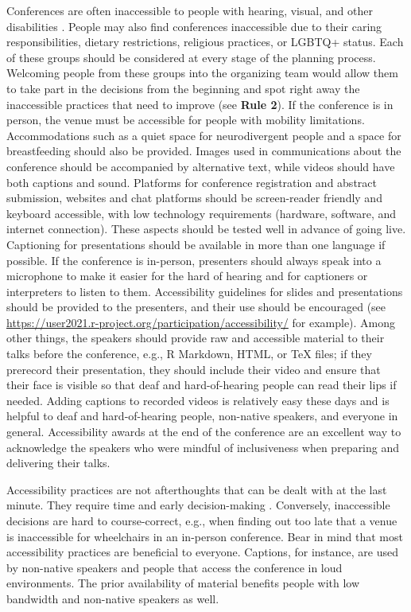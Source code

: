\documentclass[10pt,letterpaper]{article}
\begin{document}
Conferences are often inaccessible to people with hearing, visual, and other disabilities \cite{price_access_2009}. People may also find conferences inaccessible due to their caring responsibilities, dietary restrictions, religious practices, or LGBTQ+ status. Each of these groups should be considered at every stage of the planning process. Welcoming people from these groups into the organizing team would allow them to take part in the decisions from the beginning and spot right away the inaccessible practices that need to improve (see \textbf{Rule 2}). If the conference is in person, the venue must be accessible for people with mobility limitations. Accommodations such as a quiet space for neurodivergent people and a space for breastfeeding should also be provided. Images used in communications about the conference should be accompanied by alternative text, while videos should have both captions and sound. Platforms for conference registration and abstract submission, websites and chat platforms should be screen-reader friendly and keyboard accessible, with low technology requirements (hardware, software, and internet connection). These aspects should be tested well in advance of going live. Captioning for presentations should be available in more than one language if possible. If the conference is in-person, presenters should always speak into a microphone to make it easier for the hard of hearing and for captioners or interpreters to listen to them. Accessibility guidelines for slides and presentations should be provided to the presenters, and their use should be encouraged (see \url{https://user2021.r-project.org/participation/accessibility/} for example). Among other things, the speakers should provide raw and accessible material to their talks before the conference, e.g., R Markdown, HTML, or \TeX{} files; if they prerecord their presentation, they should include their video and ensure that their face is visible so that deaf and hard-of-hearing people can read their lips if needed. Adding captions to recorded videos is relatively easy these days and is helpful to deaf and hard-of-hearing people, non-native speakers, and everyone in general.  Accessibility awards at the end of the conference are an excellent way to acknowledge the speakers who were mindful of inclusiveness when preparing and delivering their talks. 

Accessibility practices are not afterthoughts that can be dealt with at the last minute. They require time and early decision-making \cite{irish_increasing_2020}. Conversely, inaccessible decisions are hard to course-correct, e.g., when finding out too late that a venue is inaccessible for wheelchairs in an in-person conference. 
Bear in mind that most accessibility practices are beneficial to everyone. Captions, for instance, are used by non-native speakers and people that access the conference in loud environments. The prior availability of material benefits people with low bandwidth and non-native speakers as well.
\end{document}
